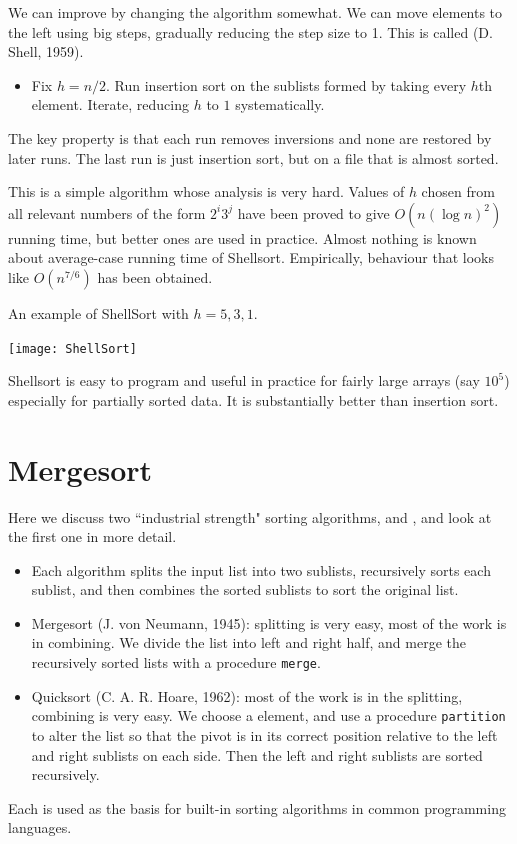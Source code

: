 We can improve by changing the algorithm somewhat.
We can move elements to the left using big steps, gradually reducing the 
step size to 1. This is called  (D. Shell, 1959). 
\begin{itemize}
  \item Fix $h = n/2$. Run insertion sort on the sublists formed by taking 
every $h$th element. Iterate, reducing $h$ to $1$ systematically. 
\end{itemize}
The key property is that each run removes inversions and none are 
restored by later runs. The last run is just insertion sort, but on a file that 
is almost sorted.

This is a simple algorithm whose analysis is very hard. 
Values of $h$ chosen from all relevant numbers of the form $2^i 3^j$ have been proved to give 
$O(n (\log n)^2)$ running time, but better ones are used in practice. 
Almost nothing is known about average-case running time of Shellsort. 
Empirically, behaviour that looks like $O(n^{7/6})$ has been obtained. 


\begin{Boxample}
An example of ShellSort with $h = 5, 3, 1$.
\begin{center}
  \texttt{[image: ShellSort]} 
\end{center}
\end{Boxample}

Shellsort is easy to program and useful in practice for fairly large arrays (say $10^5$) especially for partially sorted data. 
It is substantially  better than insertion sort.


\chapter{Mergesort}  %
\label{sec:mergesort}
Here we discuss two ``industrial strength" sorting algorithms,  and , and look at the first one in more detail.
\begin{itemize}
\item Each algorithm splits the input list into two sublists, 
recursively sorts each sublist, and then combines the sorted sublists to sort 
the original list.
\item Mergesort (J. von Neumann, 1945): splitting is very easy, most 
of the work is in combining. 
We divide the list into left and right half, and merge the recursively sorted 
lists with a procedure \texttt{merge}. 
\item Quicksort (C. A. R. Hoare, 1962): most of the work is in the 
splitting, combining is very easy. We choose a  element, and use a 
procedure \texttt{partition} to alter the list so that the pivot is in its 
correct position relative to the left and right sublists on each side. Then the left and right sublists 
are sorted recursively.
\end{itemize}
Each is used as the basis for 
built-in sorting algorithms in common programming languages.

